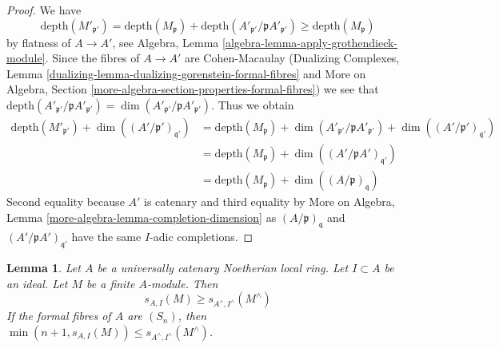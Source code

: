 \documentclass{stacks-project}
\theoremstyle{plain}
\newtheorem{lemma}[subsection]{Lemma}
\theoremstyle{definition}
\theoremstyle{remark}
\numberwithin{equation}{subsection}
\begin{document}
\begin{proof}
We have
$$
\text{depth}(M'_{\mathfrak p'}) =
\text{depth}(M_\mathfrak p) +
\text{depth}(A'_{\mathfrak p'}/\mathfrak p A'_{\mathfrak p'})
\geq \text{depth}(M_\mathfrak p)
$$
by flatness of $A \to A'$, see
Algebra, Lemma \ref{algebra-lemma-apply-grothendieck-module}.
Since the fibres of $A \to A'$ are Cohen-Macaulay
(Dualizing Complexes, Lemma
\ref{dualizing-lemma-dualizing-gorenstein-formal-fibres} and
More on Algebra, Section
\ref{more-algebra-section-properties-formal-fibres})
we see that
$\text{depth}(A'_{\mathfrak p'}/\mathfrak p A'_{\mathfrak p'}) =
\dim(A'_{\mathfrak p'}/\mathfrak p A'_{\mathfrak p'})$.
Thus we obtain
\begin{align*}
\text{depth}(M'_{\mathfrak p'}) +
\dim((A'/\mathfrak p')_{\mathfrak q'})
& =
\text{depth}(M_\mathfrak p) +
\dim(A'_{\mathfrak p'}/\mathfrak p A'_{\mathfrak p'}) +
\dim((A'/\mathfrak p')_{\mathfrak q'}) \\
& =
\text{depth}(M_\mathfrak p) +
\dim((A'/\mathfrak p A')_{\mathfrak q'}) \\
& =
\text{depth}(M_\mathfrak p) +
\dim((A/\mathfrak p)_\mathfrak q)
\end{align*}
Second equality because $A'$ is catenary and third equality by
More on Algebra, Lemma \ref{more-algebra-lemma-completion-dimension}
as $(A/\mathfrak p)_\mathfrak q$ and $(A'/\mathfrak p A')_{\mathfrak q'}$
have the same $I$-adic completions.
\end{proof}





\begin{lemma}
\label{lemma-cutoff-completion}
Let $A$ be a universally catenary Noetherian local ring.
Let $I \subset A$ be an ideal. Let $M$ be
a finite $A$-module. Then
$$
s_{A, I}(M) \geq s_{A^\wedge, I^\wedge}(M^\wedge)
$$
If the formal fibres of $A$ are $(S_n)$, then
$\min(n + 1, s_{A, I}(M)) \leq s_{A^\wedge, I^\wedge}(M^\wedge)$.
\end{lemma}
\end{document}
